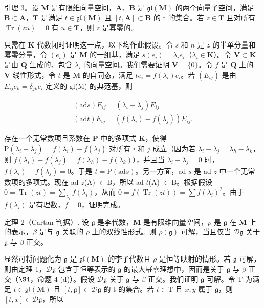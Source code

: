 引理 3。设 \(\mathbf{M}\) 是有限维向量空间，\(\mathbf{A}\)、\(\mathbf{B}\) 是 \(\mathfrak{gl}(\mathbf{M})\) 的两个向量子空间，满足 \(\mathbf{B} \subset \mathbf{A}\)，\(\mathbf{T}\) 是满足 \(t \in \mathfrak{gl}(\mathbf{M})\) 且 \([t, \mathbf{A}] \subset \mathbf{B}\) 的 t 的集合。若 \(z \in \mathbf{T}\) 且对所有 \(\operatorname{Tr}(zu) = 0\) 有 \(u \in \mathbf{T}\)，则 \(z\) 是幂零的。

只需在 \(\mathbf{K}\) 代数闭时证明这一点，以下均作此假设。令 \(s\) 和 \(n\) 是 \(z\) 的半单分量和幂零分量，令 \((e_i)\) 是 \(\mathbf{M}\) 的一组基，满足 \(s(e_i) = \lambda_i e_i\)（\(\lambda_i \in \mathbf{K}\)）。令 \(\mathbf{V} \subset \mathbf{K}\) 是由 \(\mathbf{Q}\) 生成的、包含 \(\lambda_i\) 的向量空间。我们需要证明 \(\mathbf{V} = \{0\}\)。令 \(f\) 是 \(\mathbf{Q}\) 上的 \(\mathbf{V}\)-线性形式，令 \(t\) 是 \(\mathbf{M}\) 的自同态，满足 \(te_{i}=f(\lambda_{i})e_{i}\)。若 \((E_{ij})\) 是由 \(E_{ij}e_{k}=\delta_{jk}e_{i}\) 定义的 gl(M) 的典范基，则

\[
\begin{array}{l} (\mathrm{ad} s) E _ {i j} = (\lambda_ {i} - \lambda_ {j}) E _ {i j} \\ (\mathrm{ad} t) E _ {i j} = (f (\lambda_ {i}) - f (\lambda_ {j})) E _ {i j}. \end{array}
\]

存在一个无常数项且系数在 \(\mathbf{P}\) 中的多项式 \(\mathbf{K}\)，使得 \(\mathrm{P}(\lambda_i - \lambda_j) = f(\lambda_i) - f(\lambda_j)\) 对所有 \(i\) 和 \(j\) 成立（因为若 \(\lambda_i - \lambda_j = \lambda_h - \lambda_k\)，则 \(f(\lambda_i) - f(\lambda_j) = f(\lambda_h) - f(\lambda_k)\)），并且当 \(\lambda_i - \lambda_j = 0\) 时，\(f(\lambda_i) - f(\lambda_j) = 0\)。于是 \(t = \mathrm{P}(\mathrm{ad}s)\)。另一方面，ad \(s\) 是 ad \(z\) 中一个无常数项的多项式。现在 ad \(z\)(A) \(\subset \mathrm{B}\)，所以 ad \(t\)(A) \(\subset \mathrm{B}\)。根据假设 \(0 = \operatorname{Tr}(zt) = \sum_{\lambda_i} f(\lambda_i)\)，从而 \(0 = f(\operatorname{Tr}(zt)) = \sum f(\lambda_i)^2\)。由于 \(f(\lambda_i)\) 是有理数，\(f = 0\)，证明完成。

定理 2（Cartan 判据）. 设 \(\mathfrak{g}\) 是李代数，\(\mathbf{M}\) 是有限维向量空间，\(\rho\) 是 \(\mathfrak{g}\) 在 \(\mathbf{M}\) 上的表示，\(\beta\) 是与 \(\mathfrak{g}\) 关联的 \(\rho\) 上的双线性形式。则 \(\rho(\mathfrak{g})\) 可解，当且仅当 \(\mathcal{D}\mathfrak{g}\) 关于 \(\mathfrak{g}\) 与 \(\beta\) 正交。

显然可将问题化为 \(\mathfrak{g}\) 是 \(\mathfrak{gl}(\mathbf{M})\) 的李子代数且 \(\rho\) 是恒等映射的情形。若 \(\mathfrak{g}\) 可解，则由定理 1，\(\mathcal{D}\mathfrak{g}\) 包含于恒等表示的 \(\mathfrak{g}\) 的最大幂零理想中，因而是关于 \(\mathfrak{g}\) 与 \(\beta\) 正交（\(\S 4\)，命题 4 (d)）。假设 \(\mathcal{D}\mathfrak{g}\) 关于 \(\mathfrak{g}\) 与 \(\beta\) 正交。我们证明 \(\mathfrak{g}\) 可解。令 \(\mathrm{T}\) 为满足 \(t\in \mathfrak{gl}(\mathbf{M})\) 且 \([t,\mathfrak{g}]\subset \mathcal{D}\mathfrak{g}\) 的 t 的集合。若 \(t\in \mathrm{T}\) 且 \(x,y\) 属于 \(\mathfrak{g}\)，则 \([t,x]\in \mathcal{D}\mathfrak{g}\)，所以

